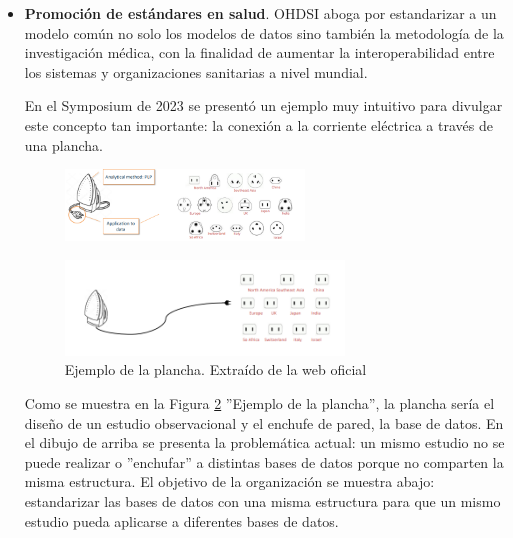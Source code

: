 \begin{itemize}
    \item \textbf{Promoción de estándares en salud}. OHDSI aboga por estandarizar a un modelo común no solo los modelos de datos sino también la metodología de la investigación médica, con la finalidad de aumentar la interoperabilidad entre los sistemas y organizaciones sanitarias a nivel mundial.
    
    En el Symposium de 2023 se presentó un ejemplo muy intuitivo para divulgar este concepto tan importante: la conexión a la corriente eléctrica a través de una plancha. 
    

\begin{figure}[H]
    \centering
    \includegraphics[width=0.60\textwidth]{figures/plancha1.png}
    \label{fig:plancha1}
\end{figure}
\begin{figure}[H]
    \centering
    \includegraphics[width=0.70\textwidth]{figures/plancha2.png}
     \caption{Ejemplo de la plancha. Extraído de la web oficial \parencite{OHDSIwebsite}}
    \label{fig:plancha2}
\end{figure}

    Como se muestra en la Figura \ref{fig:plancha2} ''Ejemplo de la plancha'', la plancha sería el diseño de un estudio observacional y el enchufe de pared, la base de datos. En el dibujo de arriba se presenta la problemática actual: un mismo estudio no se puede realizar o ''enchufar'' a distintas bases de datos porque no comparten la misma estructura. El objetivo de la organización se muestra abajo: estandarizar las bases de datos con una misma estructura para que un mismo estudio pueda aplicarse a diferentes bases de datos.


\end{itemize}
